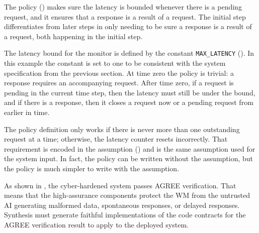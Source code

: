The policy () makes sure the latency is
bounded whenever there is a pending request, and it ensures that a
response is a result of a request.  The initial step differentiates
from later steps in only needing to be sure a response is a result of
a request, both happening in the initial step.

The latency bound for the monitor is defined by the constant
\texttt{MAX\_LATENCY} ().  In this example the
constant is set to one to be consistent with the system specification from the
previous section.  At time zero the policy is trivial: a response
requires an accompanying request.  After time zero, if a request is
pending in the current time step, then the latency must still be under
the bound, and if there is a response, then it closes a request now or
a pending request from earlier in time.

The policy definition only works if there is never more than one
outstanding request at a time; otherwise, the latency counter resets
incorrectly.  That requirement is encoded in the assumption
() and is the same assumption used for the
system input.  In fact, the policy can be written without the assumption, but
the policy is much simpler to write with the assumption.

As shown in , the cyber-hardened
system passes AGREE verification.  That means that the high-assurance
components protect the WM from the untrusted AI generating malformed
data, spontaneous responses, or delayed responses.  Synthesis must
generate faithful implementations of the code contracts for the AGREE
verification result to apply to the deployed system.
